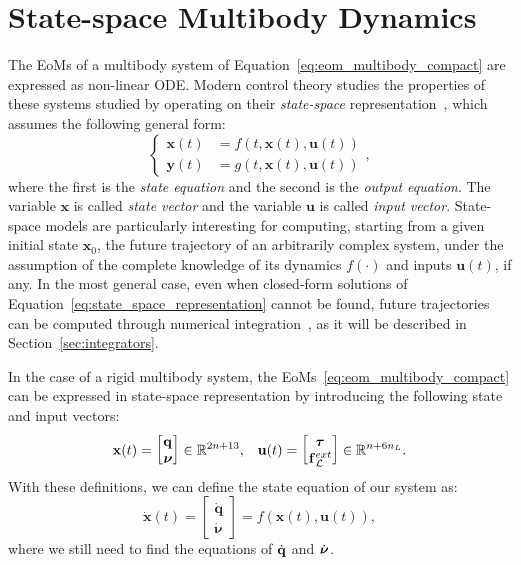 \section{State-space Multibody Dynamics}

The \acp{EoM} of a multibody system of Equation~\eqref{eq:eom_multibody_compact} are expressed as non-linear \ac{ODE}.
Modern control theory studies the properties of these systems studied by operating on their \emph{state-space} representation~\parencite{friedland_control_2005}, which assumes the following general form:
%
\begin{equation}
\label{eq:state_space_representation}
\begin{cases}
    \mathbf{x}(t) &= f \left( t, \mathbf{x}(t), \mathbf{u}(t) \right) \\
    \mathbf{y}(t) &= g \left( t, \mathbf{x}(t), \mathbf{u}(t) \right)
\end{cases}
,
\end{equation}
%
where the first is the \emph{state equation} and the second is the \emph{output equation}.
The variable $\mathbf{x}$ is called \emph{state vector} and the variable $\mathbf{u}$ is called \emph{input vector}.
State-space models are particularly interesting for computing, starting from a given initial state $\mathbf{x}_0$, the future trajectory of an arbitrarily complex system, under the assumption of the complete knowledge of its dynamics $f(\cdot)$ and inputs $\mathbf{u}(t)$, if any.
In the most general case, even when closed-form solutions of Equation~\eqref{eq:state_space_representation} cannot be found, future trajectories can be computed through numerical integration~\parencite{cellier_continuous_2006}, as it will be described in Section~\ref{sec:integrators}.

In the case of a rigid multibody system, the \acp{EoM}~\eqref{eq:eom_multibody_compact} can be expressed in state-space representation by introducing the following state and input vectors:
%
\begin{align}
    \label{eq:input_and_state_vectors}
    \mathbf{x}(t) =
    \begin{bmatrix}
        \mathbf{q} \\ \prescript{}{}{\boldsymbol{\nu}}
    \end{bmatrix}
    \in \mathbb{R}^{2n+13},
    &&
    \mathbf{u}(t) =
    \begin{bmatrix}
        \boldsymbol{\tau} \\ \prescript{}{}{\mathbf{f}}^{ext}_\mathcal{L} 
    \end{bmatrix}
    \in \mathbb{R}^{n+6n_L}.
\end{align}
%
With these definitions, we can define the state equation of our system as:
%
\begin{equation*}
    \dot{\mathbf{x}}(t) =
    \begin{bmatrix}
        \dot{\mathbf{q}} \\ \dot{\boldsymbol{\nu}}
    \end{bmatrix} =
    f\left(\mathbf{x}(t), \mathbf{u}(t)\right)
    ,
\end{equation*}
%
where we still need to find the equations of $\dot{\mathbf{q}}$ and $\prescript{}{}{\dot{\boldsymbol{\nu}}}$.

